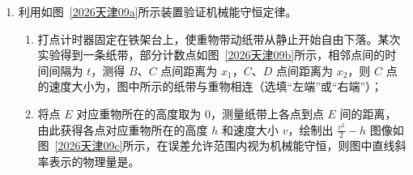 \documentclass[\gkver]{gaokaozhenti}
\begin{document}
\begin{enumerate}
{D．轴线上从 $O$ 点向无穷远延伸时，场强从 0 开始，先增大到一个最大值，再逐渐减小到 0。如果 $A$ 点位于场强最大值的外侧，从 $A$ 向 $O$ 运动的过程中，场强会先增大、后减小，由 $a = \frac{qE}{m}$ 可知，加速度也会先增大后减小，并非一定逐渐减小，故 D 错误。

故选 AC。
}

\item
利用如图~\ref{2026天津09a}所示装置验证机械能守恒定律。
\begin{enumerate}
	\item
	打点计时器固定在铁架台上，使重物带动纸带从静止开始自由下落。某次实验得到一条纸带，部分计数点如图~\ref{2026天津09b}所示，相邻点间的时间间隔为 $t$，测得 $B$、$C$ 点间距离为 $x_{1}$，$C$、$D$ 点间距离为 $x_{2}$，则 $C$ 点的速度大小为，图中所示的纸带与重物相连（选填“左端”或“右端”）；
	\item
	将点 $E$ 对应重物所在的高度取为 0，测量纸带上各点到点 $E$ 间的距离，由此获得各点对应重物所在的高度 $h$ 和速度大小 $v$，绘制出 $\frac{v^{2}}{2}-h$ 图像如图~\ref{2026天津09c}所示，在误差允许范围内视为机械能守恒，则图中直线斜率表示的物理量是。
\end{enumerate}
\threepicture[labelA=2026天津09a, labelB=2026天津09b, labelC=2026天津09c, align=right, hA=5.61cm, wB=9.33cm, hC=2.56cm]{}{}{}


\end{enumerate}
\end{document}
